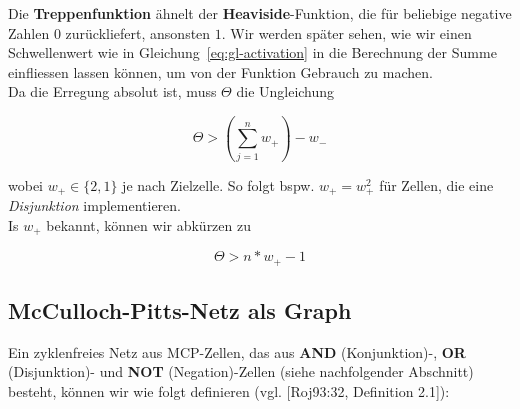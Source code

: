 \noindent
Die \textbf{Treppenfunktion} ähnelt der \textbf{Heaviside}-Funktion, die für beliebige negative Zahlen $0$ zurückliefert, ansonsten $1$.
Wir werden später sehen, wie wir einen Schwellenwert wie in Gleichung~\ref{eq:gl-activation} in die Berechnung der Summe einfliessen lassen können, um von der Funktion Gebrauch zu machen.\\

\noindent
Da die Erregung absolut ist, muss $\Theta$ die Ungleichung

\begin{equation}
\Theta > (\sum^n_{j=1} w_+) - w_-
\end{equation}\linebreak[2]

\noindent
wobei $w_+ \in \{2, 1\}$ je nach Zielzelle. So folgt bspw. $w_+ = w^2_+$ für Zellen, die eine \textit{Disjunktion} implementieren.\\

\noindent
Is $w_+$ bekannt, können wir abkürzen zu

\begin{equation}
\Theta > n * w_+ - 1
\end{equation}


\subsection{McCulloch-Pitts-Netz als Graph}

Ein zyklenfreies Netz aus MCP-Zellen, das aus \textbf{AND} (Konjunktion)-, \textbf{OR} (Disjunktion)- und \textbf{NOT} (Negation)-Zellen (siehe nachfolgender Abschnitt) besteht, können wir wie folgt definieren (vgl. [Roj93:32, Definition 2.1]):


